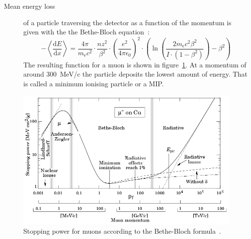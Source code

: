 \begin{description}
\item[Mean energy loss] of a particle traversing the detector as a function of the momentum is given with the the Bethe-Bloch equation~\cite{}: 
\begin{equation}
-\left\langle\frac{\mathrm{d}E}{\mathrm{d}x}\right\rangle = \frac{4\pi}{m_\mathrm{e}c^2}  \cdot \frac{nz^2}{\beta^2}  \cdot  \left(\frac{e^2}{4\pi\epsilon_\mathrm{0}}\right)^2  \cdot  \left( \ln \left(\frac{2m_\mathrm{e}c^2\beta^2}{I\cdot(1-\beta^2)}\right)-\beta^2  \right)
\label{eq:bethebloch}
\end{equation}
The resulting function for a muon is shown in figure~\ref{fig:bb2}. At a momentum of around 300~MeV/c the particle deposits the lowest amount of energy. That is called a minimum ionising particle or a MIP.
\end{description}


\begin{figure}[!t]
\begin{center}
\includegraphics[width=0.85\linewidth]{02_pulse_formation/pics/bb2}
\caption{Stopping power for muons according to the Bethe-Bloch formula~\cite{}.}
\label{fig:bb2}
\end{center}
\end{figure}



